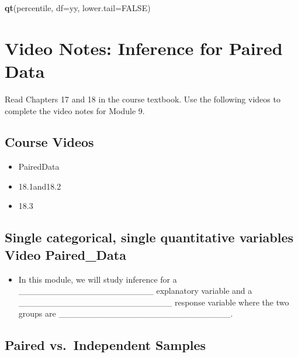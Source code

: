 \documentclass[
]{report}
\newenvironment{Shaded}{\begin{snugshade}}{\end{snugshade}}
\newcommand{\AttributeTok}[1]{\textcolor[rgb]{0.13,0.29,0.53}{#1}}
\newcommand{\ConstantTok}[1]{\textcolor[rgb]{0.56,0.35,0.01}{#1}}
\newcommand{\FunctionTok}[1]{\textcolor[rgb]{0.13,0.29,0.53}{\textbf{#1}}}
\newcommand{\NormalTok}[1]{#1}
\providecommand{\tightlist}{%
  \setlength{\itemsep}{0pt}\setlength{\parskip}{0pt}}
\begin{document}
\begin{Shaded}
\begin{Highlighting}[]
\FunctionTok{qt}\NormalTok{(percentile, }\AttributeTok{df=}\NormalTok{yy, }\AttributeTok{lower.tail=}\ConstantTok{FALSE}\NormalTok{)}
\end{Highlighting}
\end{Shaded}

\newpage

\section{Video Notes: Inference for Paired Data}\label{video-notes-inference-for-paired-data}

Read Chapters 17 and 18 in the course textbook. Use the following videos to complete the video notes for Module 9.

\subsection{Course Videos}\label{course-videos-8}

\begin{itemize}
\item
  PairedData
\item
  18.1and18.2
\item
  18.3
\end{itemize}


\subsection*{Single categorical, single quantitative variables Video Paired\_Data}\label{single-categorical-single-quantitative-variables-video-paired_data}

\begin{itemize}
\tightlist
\item
  In this module, we will study inference for a \_\_\_\_\_\_\_\_\_\_\_\_\_\_\_\_\_\_\_\_\_\_ explanatory variable and a \_\_\_\_\_\_\_\_\_\_\_\_\_\_\_\_\_\_\_\_\_\_\_\_\_ response variable where the two groups are \_\_\_\_\_\_\_\_\_\_\_\_\_\_\_\_\_\_\_\_\_\_\_\_\_\_\_\_.
\end{itemize}

\subsection*{Paired vs.~Independent Samples}\label{paired-vs.-independent-samples}
\end{document}
